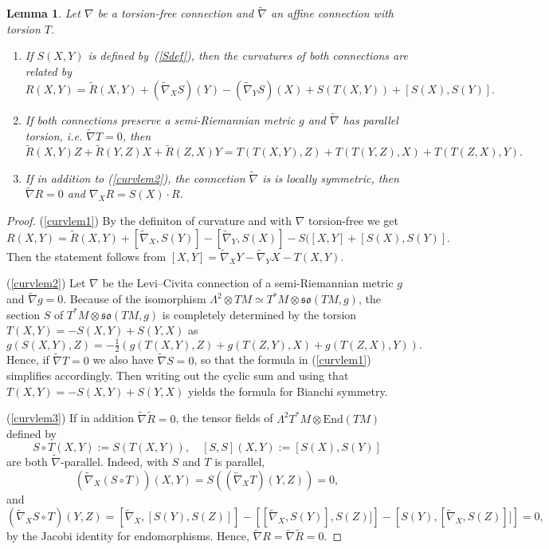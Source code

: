 \documentclass[11pt,a4paper]{amsart}
\newcommand{\tnab}{\widetilde{\nabla}}
\newcommand{\tR}{\widetilde{R}}
\newcommand{\+}{\oplus}
\newcommand{\so}{\mathfrak{so}}
\newcommand{\1}{\mathbf{1}}
\newcommand{\End}{\mathrm{End}}
\newcommand{\<}{\langle}
\renewcommand{\>}{\rangle}
\theoremstyle{definition}
\theoremstyle{plain}
\newtheorem{lemma}[definition]{Lemma}
\numberwithin{equation}{section}
\begin{document}
\begin{lemma}\label{curvlem}
Let $\nabla$ be a torsion-free connection and $\tnab$ an affine connection with torsion $T$. 
\begin{enumerate}
\item\label{curvlem1} 
 If $S(X,Y)$ is defined by~(\ref{Sdef}), then the curvatures of both connections are related by
\[R(X,Y)=\tR(X,Y)+(\tnab_XS)(Y)-(\tnab_YS)(X)+S(T(X,Y))+[ S(X),S(Y)].\]
\item\label{curvlem2}
If  both connections preserve  a semi-Riemannian metric $g$  and $\tnab $ has parallel torsion, i.e. $\tnab T=0$, then
\[ \tR(X,Y)Z+\tR(Y,Z)X+\tR(Z,X)Y= T(T(X,Y),Z)+ T(T(Y,Z),X)+T(T(Z,X),Y).\]
\item\label{curvlem3} If in addition to (\ref{curvlem2}), the conncetion $\tnab$ is is locally symmetric, then $\tnab R=0$ and $\nabla_XR=S(X)\cdot R$.
\end{enumerate}
\end{lemma} 
\begin{proof}
(\ref{curvlem1}) By the definiton of curvature and  with $\nabla$ torsion-free we get
\[R(X,Y)=\tR(X,Y )+[ \tnab_X,S(Y)] -[ \tnab_Y,S(X)] -S([X,Y] + [S(X),S(Y)].\]
Then the statement follows from $[X,Y]=\tnab_XY  -\tnab_YX-T(X,Y)$.

(\ref{curvlem2}) Let $\nabla$ be the Levi--Civita connection of a semi-Riemannian metric $g$ and $\tnab g=0$. Because of the isomorphism $\Lambda^2\otimes TM\simeq T^*M\otimes \so(TM,g)$, the section $S$ of $T^*M\otimes \so(TM,g)$ is completely determined by the torsion $T(X,Y)=-S(X,Y)+S(Y,X)$ as 
\[g(S(X,Y),Z)= -\tfrac{1}{2}\left( g(T(X,Y),Z)+ g(T(Z,Y),X)+g(T(Z,X),Y)\right).
\] 
Hence, if $\tnab T=0$ we also have $\tnab S=0$, so that the formula in (\ref{curvlem1}) simplifies accordingly. Then writing out the cyclic sum and using that $T(X,Y)=-S(X,Y)+S(Y,X)$ yields the formula for Bianchi symmetry.

(\ref{curvlem3}) 
If in addition $\tnab\tR=0$,  the tensor fields of $\Lambda^2T^*M \otimes \End(TM)$ defined by
\[S\circ T(X,Y):=S(T(X,Y)),\quad [S,S](X,Y):=[S(X),S(Y)] \]
are both $\tnab$-parallel. Indeed, with $S$ and $T$ is parallel, 
\[(\tnab_X (S\circ T)) (X,Y)= S((\tnab_X T)(Y,Z))=0,\]
and 
\[(\tnab_X S\circ T)(Y,Z)
=
\left[\tnab_X,[S(Y),S(Z)]\right]
-
\left[[ \tnab_X,S(Y)],S(Z)]\right]
-
\left[S(Y),[ \tnab_X,S(Z)]]\right]
=0,
\]
by the Jacobi identity for endomorphisms. Hence, $\tnab R=\tnab \tR=0$.
\end{proof}
\end{document}
